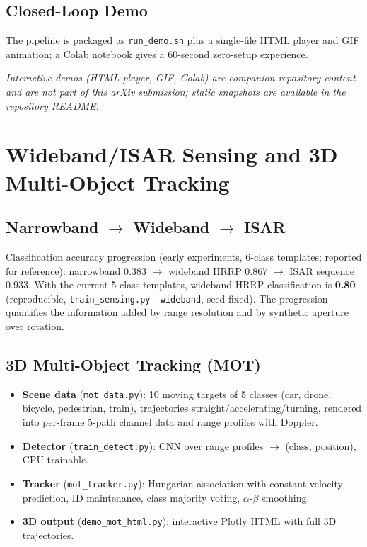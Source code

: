 \documentclass[11pt]{article}
\begin{document}
\subsection{Closed-Loop Demo}

The pipeline is packaged as \texttt{run\_demo.sh} plus a single-file HTML player and GIF animation; a Colab notebook gives a 60-second zero-setup experience.

\textit{Interactive demos (HTML player, GIF, Colab) are companion repository content and are not part of this arXiv submission; static snapshots are available in the repository README.}


\section{Wideband/ISAR Sensing and 3D Multi-Object Tracking}

\subsection{Narrowband $\rightarrow$ Wideband $\rightarrow$ ISAR}

Classification accuracy progression (early experiments, 6-class templates; reported for reference): narrowband 0.383 $\rightarrow$ wideband HRRP 0.867 $\rightarrow$ ISAR sequence 0.933. With the current 5-class templates, wideband HRRP classification is \textbf{0.80} (reproducible, \texttt{train\_sensing.py --wideband}, seed-fixed). The progression quantifies the information added by range resolution and by synthetic aperture over rotation.

\subsection{3D Multi-Object Tracking (MOT)}

\begin{itemize}
\item \textbf{Scene data} (\texttt{mot\_data.py}): 10 moving targets of 5 classes (car, drone, bicycle, pedestrian, train), trajectories straight/accelerating/turning, rendered into per-frame 5-path channel data and range profiles with Doppler.
\item \textbf{Detector} (\texttt{train\_detect.py}): CNN over range profiles $\rightarrow$ (class, position), CPU-trainable.
\item \textbf{Tracker} (\texttt{mot\_tracker.py}): Hungarian association with constant-velocity prediction, ID maintenance, class majority voting, $\alpha$-$\beta$ smoothing.
\item \textbf{3D output} (\texttt{demo\_mot\_html.py}): interactive Plotly HTML with full 3D trajectories.
\end{itemize}
\end{document}
